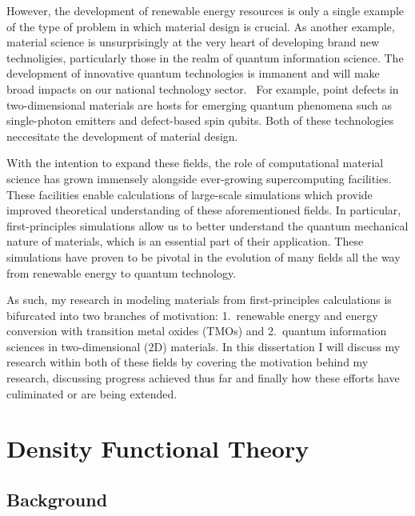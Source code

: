 However, the development of renewable energy resources is only a single example of the type of problem in which material design is crucial. As another example, material science is unsurprisingly at the very heart of developing brand new technoligies, particularly those in the realm of quantum information science. The development of innovative quantum technologies is immanent and will make broad impacts on our national technology sector.~\cite{quantum} For example, point defects in two-dimensional materials are hosts for emerging quantum phenomena such as single-photon emitters and defect-based spin qubits. Both of these technologies neccesitate the development of material design.

With the intention to expand these fields, the role of computational material science has grown immensely alongside ever-growing supercomputing facilities. These facilities enable calculations of large-scale simulations which provide improved theoretical understanding of these aforementioned fields. In particular, first-principles simulations allow us to better understand the quantum mechanical nature of materials, which is an essential part of their application. These simulations have proven to be pivotal in the evolution of many fields all the way from renewable energy to quantum technology.

As such, my research in modeling materials from first-principles calculations is bifurcated into two branches of motivation: 1.\ renewable energy and energy conversion with transition metal oxides (TMOs) and 2.\ quantum information sciences in two-dimensional (2D) materials. In this dissertation I will discuss my research within both of these fields by covering the motivation behind my research, discussing progress achieved thus far and finally how these efforts have culiminated or are being extended.



\section{Density Functional Theory}

\subsection{Background}

